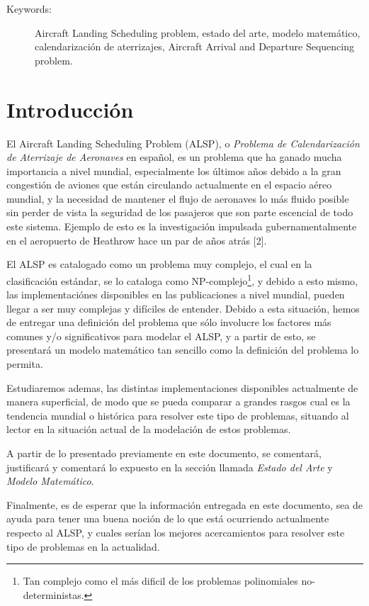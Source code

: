 \documentclass[letter, 11pt]{article}
\begin{document}
\begin{description}
\item[Keywords:] Aircraft Landing Scheduling problem, estado del arte, modelo matemático, calendarización de aterrizajes, Aircraft Arrival and Departure Sequencing problem.
\end{description}
\newpage

\section{Introducción}
El Aircraft Landing Scheduling Problem (ALSP), o \textit{Problema de Calendarización de Aterrizaje de Aeronaves} en español, es un problema que ha ganado mucha importancia a nivel mundial, especialmente los últimos años debido a la gran congestión de aviones que están circulando actualmente en el espacio aéreo mundial, y la necesidad de mantener el flujo de aeronaves lo más fluido posible sin perder de vista la seguridad de los pasajeros que son parte escencial de todo este sistema. Ejemplo de esto es la investigación impulsada gubernamentalmente en el aeropuerto de Heathrow hace un par de años atrás [2].

El ALSP es catalogado como un problema muy complejo, el cual en la clasificación estándar, se lo cataloga como NP-complejo\footnote{Tan complejo como el más dificil de los problemas polinomiales no-deterministas.}, y debido a esto mismo, las implementaciónes disponibles en las publicaciones a nivel mundial, pueden llegar a ser muy complejas y difíciles de entender. Debido a esta situación, hemos de entregar una definición del problema que sólo involucre los factores más comunes y/o significativos para modelar el ALSP, y a partir de esto, se presentará un modelo matemático tan sencillo como la definición del problema lo permita.

Estudiaremos ademas, las distintas implementaciones disponibles actualmente de manera superficial, de modo que se pueda comparar a grandes rasgos cual es la tendencia mundial o histórica para resolver este tipo de problemas, situando al lector en la situación actual de la modelación de estos problemas.

A partir de lo presentado previamente en este documento, se comentará, justificará y comentará lo expuesto en la sección llamada \textit{Estado del Arte} y \textit{Modelo Matemático}.

Finalmente, es de esperar que la información entregada en este documento, sea de ayuda para tener una buena noción de lo que está ocurriendo actualmente respecto al ALSP, y cuales serían los mejores acercamientos para resolver este tipo de problemas en la actualidad.
\end{document}
